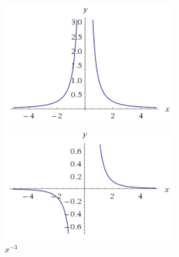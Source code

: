 \begin{figure}[ht!]
	\centering
	\begin{minipage}[t]{0.4\textwidth}
		\centering
		\includegraphics[width=\textwidth]{images/graph_x_-2}
		\caption{$x^{-2}$}
	\end{minipage}
	\begin{minipage}[t]{0.4\textwidth}
		\centering
		\includegraphics[width=\textwidth]{images/graph_x_-3}
		\caption{$x^{-3}$}
	\end{minipage}
\end{figure}
